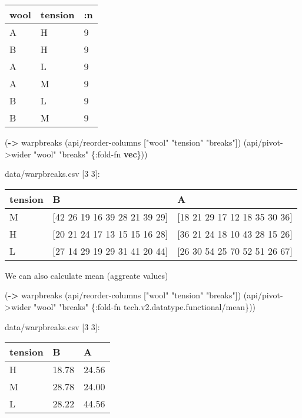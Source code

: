 \documentclass[]{article}
\newenvironment{Shaded}{\begin{snugshade}}{\end{snugshade}}
\newcommand{\KeywordTok}[1]{\textcolor[rgb]{0.13,0.29,0.53}{\textbf{#1}}}
\newcommand{\StringTok}[1]{\textcolor[rgb]{0.31,0.60,0.02}{#1}}
\newcommand{\AttributeTok}[1]{\textcolor[rgb]{0.77,0.63,0.00}{#1}}
\newcommand{\NormalTok}[1]{#1}
\begin{document}
\begin{longtable}[]{@{}lll@{}}
\toprule
wool & tension & :n\tabularnewline
\midrule
\endhead
A & H & 9\tabularnewline
B & H & 9\tabularnewline
A & L & 9\tabularnewline
A & M & 9\tabularnewline
B & L & 9\tabularnewline
B & M & 9\tabularnewline
\bottomrule
\end{longtable}

\begin{Shaded}
\begin{Highlighting}[]
\NormalTok{(}\KeywordTok{->}\NormalTok{ warpbreaks}
\NormalTok{    (api/reorder-columns [}\StringTok{"wool"} \StringTok{"tension"} \StringTok{"breaks"}\NormalTok{])}
\NormalTok{    (api/pivot->wider }\StringTok{"wool"} \StringTok{"breaks"}\NormalTok{ \{}\AttributeTok{:fold-fn} \KeywordTok{vec}\NormalTok{\}))}
\end{Highlighting}
\end{Shaded}

data/warpbreaks.csv {[}3 3{]}:

\begin{longtable}[]{@{}lll@{}}
\toprule
tension & B & A\tabularnewline
\midrule
\endhead
M & {[}42 26 19 16 39 28 21 39 29{]} & {[}18 21 29 17 12 18 35 30
36{]}\tabularnewline
H & {[}20 21 24 17 13 15 15 16 28{]} & {[}36 21 24 18 10 43 28 15
26{]}\tabularnewline
L & {[}27 14 29 19 29 31 41 20 44{]} & {[}26 30 54 25 70 52 51 26
67{]}\tabularnewline
\bottomrule
\end{longtable}

We can also calculate mean (aggreate values)

\begin{Shaded}
\begin{Highlighting}[]
\NormalTok{(}\KeywordTok{->}\NormalTok{ warpbreaks}
\NormalTok{    (api/reorder-columns [}\StringTok{"wool"} \StringTok{"tension"} \StringTok{"breaks"}\NormalTok{])}
\NormalTok{    (api/pivot->wider }\StringTok{"wool"} \StringTok{"breaks"}\NormalTok{ \{}\AttributeTok{:fold-fn}\NormalTok{ tech.v2.datatype.functional/mean\}))}
\end{Highlighting}
\end{Shaded}

data/warpbreaks.csv {[}3 3{]}:

\begin{longtable}[]{@{}lll@{}}
\toprule
tension & B & A\tabularnewline
\midrule
\endhead
H & 18.78 & 24.56\tabularnewline
M & 28.78 & 24.00\tabularnewline
L & 28.22 & 44.56\tabularnewline
\bottomrule
\end{longtable}
\end{document}
